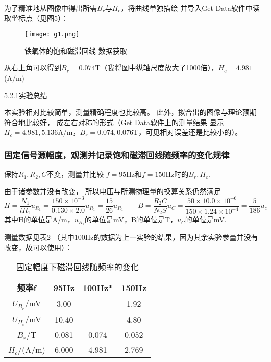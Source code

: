 \documentclass[11pt]{article}
\begin{document}
为了精准地从图像中得出所需$B_r$与$H_c$，将曲线单独描绘
并导入Get Data软件中读取坐标点（见图5）：

\begin{figure}[htbp]
    \centering
    \texttt{[image: g1.png]}
    \caption{铁氧体的饱和磁滞回线-数据获取}
\end{figure}
从右上角可以得到$B_r=0.074 $T（我将图中纵轴尺度放大了1000倍），$H_c=4.981 $(A/m)

\begin{center}
\large{5.2.1实验总结}
\end{center}

本实验相对比较简单，测量精确程度也比较高。
此外，拟合出的图像与理论预期符合地比较好，
成左右对称的形式（Get Data软件上的测量结果
显示$H_c=4.981,5.136$A/m，$B_r=0.074,0.076$T，可见相对误差还是比较小的）。







\subsubsection{固定信号源幅度，观测并记录饱和磁滞回线随频率的变化规律}

保持$R_1,R_2,C$不变，测量并比较
$f=95\text{Hz}$和$f=150\text{Hz}$时的$B_r,H_c$.

由于诸参数并没有改变，
所以电压与所测物理量的换算关系仍然满足
\[
    H=\frac{N_1}{l R_1}u_{R_1}=\frac{150\times 10^{-3}}{0.130\times 2.0}u_{R_1}=\frac{15}{26}u_{R_1}\qquad
    B = \frac{R_2 C}{N_2 S}u_C=\frac{50\times 10.0\times 10^{-6}}{150\times 1.24\times 10^{-4}}=\frac {5}{186}u_c
\]
其中H的单位是A/m，$u_{R_1}$的单位是mV，B的单位是T，$u_C$的单位是mV.



测量数据见表2
（其中100Hz的数据为上一实验的结果，因为其余实验参量并没有改变，故可以使用）：
\begin{table}[!ht]
    \centering
    \begin{tabular}{cccc}
        \toprule
        频率f & 95Hz&100Hz* & 150Hz \\ \midrule
        $U_{B_r}$/mV & 3.00 &-& 1.92 \\ 
        $U_{H_c}$/mV & 10.40&- & 4.80 \\ \midrule
        $B_r$/T & 0.081  &0.074& 0.052  \\ 
        $H_c$/(A/m) & 6.000 & 4.981& 2.769 \\ 
        \bottomrule
    \end{tabular}
    \caption{固定幅度下磁滞回线随频率的变化}
\end{table}
\end{document}
